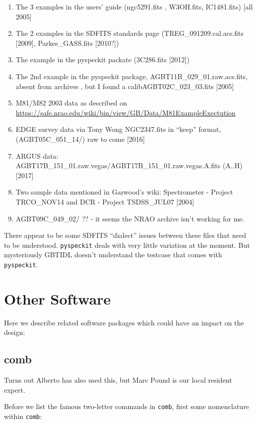 \documentclass[12pt,a4paper]{article}
\begin{document}
\begin{enumerate}

\item
  The 3 examples in the users' guide (ngc5291.fits , W3OH.fits, IC1481.fits) [all 2005]
\item
  The 2 examples in the SDFITS standards page (TREG\_091209.cal.acs.fits [2009], Parkes\_GASS.fits [2010?])
\item
  The example in the pyspeckit packate (3C286.fits [2012])
\item  
  The 2nd example in the pyspeckit package, AGBT11B\_029\_01.raw.acs.fits, absent from archives , but I found a calibAGBT02C\_023\_03.fits [2005]
\item
  M81/M82 2003 data as described on\newline
  \url{https://safe.nrao.edu/wiki/bin/view/GB/Data/M81ExampleExectution}
\item
  EDGE survey data via Tony Wong NGC2347.fits in ``keep'' format, (AGBT05C\_051\_14/) raw to come [2016]
\item
  ARGUS data: AGBT17B\_151\_01.raw.vegas/AGBT17B\_151\_01.raw.vegas.A.fits (A..H) [2017]
\item
  Two sample data mentioned in Garwood's wiki: Spectrometer - Project TRCO\_NOV14 and DCR - Project TSDSS\_JUL07 [2004]
\item
  AGBT09C\_049\_02/ ??  - it seems the NRAO archive isn't working for me.
\end{enumerate}

There appear to be some SDFITS ``dialect'' issues between these files that need to be understood.
{\tt pyspeckit} deals with very little variation at the moment. But mysteriously GBTIDL doesn't understand the
testcase that comes with {\tt pyspeckit}.

\section{Other Software}

Here we describe related software packages which could have an impact on the design:

\subsection{comb}

Turns out Alberto has also used this, but Marc Pound is our local resident expert.

Before we list the famous two-letter commands in {\tt comb}, first some nomenclature within {\tt comb}:
\end{document}
